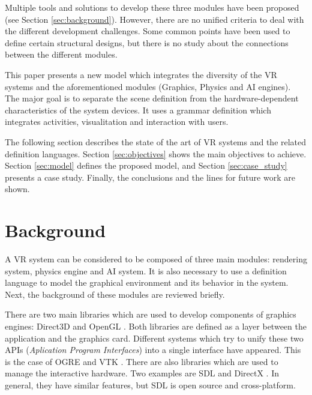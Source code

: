 \documentclass[twocolumn]{svjour3}
\begin{document}
Multiple tools and solutions to develop these three modules have been proposed (see Section
\ref{sec:background}). However, there are no unified criteria to deal with the different
development challenges. Some common points have been used to define certain structural designs, but
there is no study about the connections between the different modules.

This paper presents a new model which integrates the diversity of the VR systems and the
aforementioned modules (Graphics, Physics and AI engines). The major goal is to
separate the scene definition from the hardware-dependent characteristics of the system devices. It
uses a grammar definition which integrates activities, visualitation and interaction with users.

The following section describes the state of the art of VR systems and the related definition
languages. Section \ref{sec:objectives} shows the main objectives to achieve. Section
\ref{sec:model} defines the proposed model, and Section \ref{sec:case_study} presents a case study.
Finally, the conclusions and the lines for future work are shown.



\section{Background
\label{sec:background}}

A VR system can be considered to be composed of three main modules: rendering system, physics
engine and AI system. It is also necessary to use a definition language to model the graphical
environment and its behavior in the system. Next, the background of these modules are reviewed
briefly.

There are two main libraries which are used to develop components of graphics engines: Direct3D
\cite{DirectX} and OpenGL \cite{OpenGL}. Both libraries are defined as a layer between the
application and the graphics card. Different systems which try to unify these two APIs
(\textit{Aplication Program Interfaces}) into a single interface have appeared. This is the case of
OGRE \cite{OGRE} and VTK \cite{VTK}. There are also libraries which are used to manage the
interactive hardware. Two examples are SDL \cite{SDL} and DirectX \cite{DirectX}. In general, they
have similar features, but SDL is open source and cross-platform.
\end{document}
